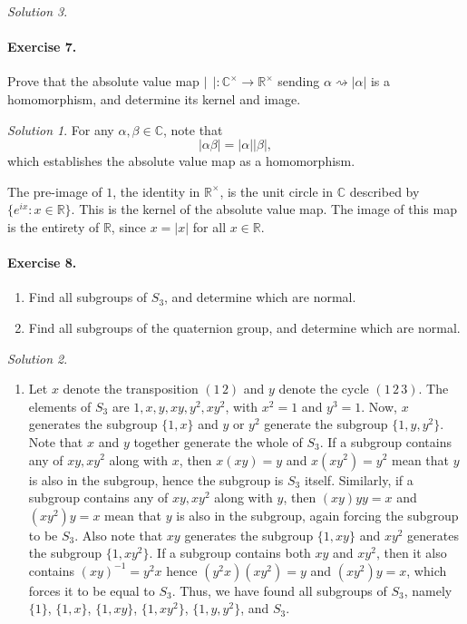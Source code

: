 \documentclass[11pt]{report}
\def\C{\mathbb{C}}
\def\R{\mathbb{R}}
\theoremstyle{remark}
\newtheorem*{solution}{Solution}
\begin{document}
\begin{solution}
    \paragraph{Exercise 7.} Prove that the absolute value map $|~ ~|\colon
    \C^\times \to \R^\times$ sending $\alpha \rightsquigarrow |\alpha|$ is a
    homomorphism, and determine its kernel and image.
    \begin{solution}
        For any $\alpha, \beta \in \C$, note that \[
            |\alpha\beta| = |\alpha| |\beta|,
        \] which establishes the absolute value map as a homomorphism.

        The pre-image of $1$, the identity in $\R^\times$, is the unit circle in
        $\C$ described by $\{e^{ix}\colon x \in \R\}$. This is the kernel of the
        absolute value map. The image of this map is the entirety of $\R$, since
        $x = |x|$ for all $x \in \R$.
    \end{solution}

    \paragraph{Exercise 8.} \mbox{}
    \begin{enumerate}
        \itemsep0em 
        \item Find all subgroups of $S_3$, and determine which are normal.
        \item Find all subgroups of the quaternion group, and determine which are
        normal.
    \end{enumerate}
    \begin{solution} \mbox{}
    \begin{enumerate}
        \item Let $x$ denote the transposition $(1\, 2)$ and $y$ denote the cycle
        $(1\, 2\, 3)$. The elements of $S_3$ are $1, x, y, xy, y^2, xy^2$, with $x^2
        = 1$ and $y^3 = 1$. Now, $x$ generates the subgroup $\{1, x\}$ and $y$ or
        $y^2$ generate the subgroup $\{1, y, y^2\}$. Note that $x$ and $y$ together
        generate the whole of $S_3$. If a subgroup contains any of $xy, xy^2$ along
        with $x$, then $x(xy) = y$ and $x(xy^2) = y^2$ mean that $y$ is also in the
        subgroup, hence the subgroup is $S_3$ itself. Similarly, if a subgroup
        contains any of $xy, xy^2$ along with $y$, then $(xy)yy = x$ and $(xy^2)y =
        x$ mean that $y$ is also in the subgroup, again forcing the subgroup to be
        $S_3$. Also note that $xy$ generates the subgroup $\{1, xy\}$ and $xy^2$
        generates the subgroup $\{1, xy^2\}$. If a subgroup contains both $xy$ and
        $xy^2$, then it also contains $(xy)^{-1} = y^2x$ hence $(y^2x)(xy^2) = y$
        and $(xy^2)y = x$, which forces it to be equal to $S_3$.
        Thus, we have found all subgroups of $S_3$, namely $\{1\}$, $\{1,
        x\}$, $\{1, xy\}$, $\{1, xy^2\}$, $\{1, y, y^2\}$, and $S_3$.


\end{enumerate}
\end{solution}
\end{solution}
\end{document}
